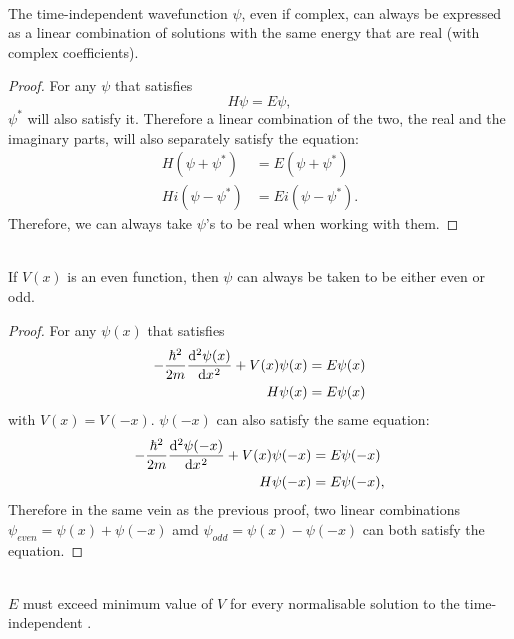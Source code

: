 \begin{thrm}
\label{psi_real}
\ \\
The time-independent wavefunction $\psi$, even if complex, can always be expressed as a linear combination of solutions with the same energy that are real (with complex coefficients).
\end{thrm}
\begin{proof}
For any $\psi$ that satisfies 
\begin{equation}
 H\psi=E\psi, 
\end{equation}
$\psi^*$ will also satisfy it. Therefore a linear combination of the two, \ie the real and the imaginary parts, will also separately satisfy the equation:
\begin{equation}
\begin{aligned}
 H(\psi+\psi^*)&=E(\psi+\psi^*) \\
 H i(\psi-\psi^*)&=Ei(\psi-\psi^*). 
\end{aligned}
\end{equation}
Therefore, we can always take $\psi$'s to be real when working with them. 
\end{proof}
\begin{thrm}
\ \\
If $V(x)$ is an even function, then $\psi$ can always be taken to be either even or odd.
\end{thrm}
\begin{proof}
For any $\psi(x)$ that satisfies
\begin{equation}
\begin{aligned}
-\frac{\hbar^2}{2m}\diff[2]{\psi(x)}{x}+V(x)\psi(x)&=E\psi(x)\\
 H\psi(x)&=E\psi(x)
\end{aligned}
\end{equation}
with $V(x)=V(-x)$. $\psi(-x)$ can also satisfy the same equation: 
\begin{equation}
\begin{aligned}
-\frac{\hbar^2}{2m}\diff[2]{\psi(-x)}{x}+V(x)\psi(-x)&=E\psi(-x)\\
 H\psi(-x)&=E\psi(-x), 
\end{aligned}
\end{equation}
Therefore in the same vein as the previous proof, two linear combinations 
$\psi_{even}=\psi(x)+\psi(-x)$ amd $\psi_{odd}=\psi(x)-\psi(-x)$ can both satisfy the equation. 
\end{proof}
\begin{thrm}
\label{thrm_minv}
\ \\
$E$ must exceed minimum value of $V$ for every normalisable solution to the time-independent \sch. 
\end{thrm}
